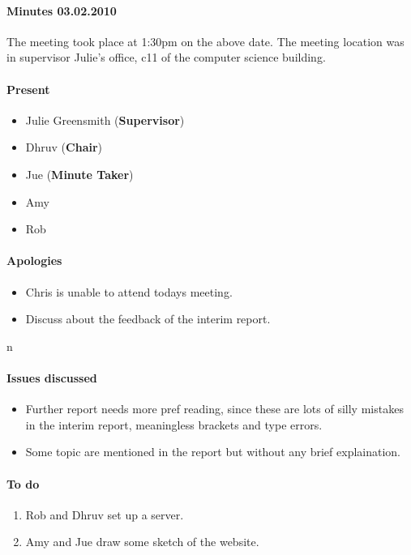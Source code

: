 \paragraph{Minutes 03.02.2010}  
The meeting took place at 1:30pm on the above date. The meeting location was in supervisor Julie's office, c11 of the computer science building. 

\paragraph{Present}

\begin{itemize}
	\item Julie Greensmith (\textbf{Supervisor})
	\item Dhruv (\textbf{Chair})
	\item Jue (\textbf{Minute Taker})
	\item Amy 
	\item Rob
	
\end{itemize}


\paragraph{Apologies}

\begin{itemize}
	\item Chris is unable to attend todays meeting.
	\item Discuss about the feedback of the interim report.
\end{itemize}
n

\paragraph{Issues discussed}

\begin{itemize}
	\item Further report needs more pref reading, since these are lots of silly mistakes in the interim report, meaningless brackets and type errors. 
	\item Some topic are mentioned in the report but without any brief explaination. 
\end{itemize}

\paragraph{To do}

\begin{enumerate}
	\item Rob and Dhruv set up a server.
	\item Amy and Jue draw some sketch of the website.
\end{enumerate}